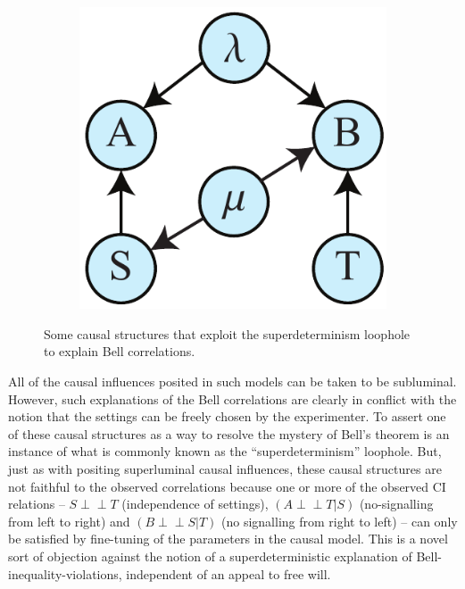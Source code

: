 \documentclass[letterpaper,onecolumn,nofootinbib]{revtex4}
\def\indep{\perp\!\!\!\!\perp}
\begin{document}
\begin{figure}[h]
\begin{subfigure}[b]{0.18\textwidth}
             	\subcaption{}
                	\label{fig:superdetb}
        \end{subfigure}
        \hspace{5em}
        \begin{subfigure}[b]{0.18\textwidth}
                	\centering
        	\includegraphics[width=\textwidth]{bell-SB}
             	\subcaption{}
                	\label{fig:superdetc}
        \end{subfigure}
 \caption{Some causal structures that exploit the superdeterminism loophole to explain Bell correlations.}
\label{fig:superdet}
\end{figure}

All of the causal influences posited in such models can be taken to be subluminal.  However, such explanations of the Bell correlations are clearly in conflict with the notion that the settings can be freely chosen by the experimenter. To assert one of these causal structures as a way to resolve the mystery of Bell's theorem is an instance of what is commonly known as the ``superdeterminism'' loophole.
But, just as with positing superluminal causal influences, these causal structures are not faithful to the observed correlations because one or more of the observed CI relations -- $S \indep T$ (independence of settings),  $\left( A\indep T|S\right)$ (no-signalling from left to right) and $\left( B\indep S|T\right)$ (no signalling from right to left) -- can only be satisfied by fine-tuning of the parameters in the causal model.  This is a novel sort of objection against the notion of a superdeterministic explanation of Bell-inequality-violations, independent of an appeal to free will.
\end{document}
